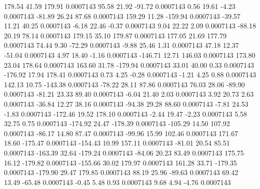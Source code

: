       178.54       41.59      179.91     0.0007143
       95.58       21.92      -91.72     0.0007143
        0.56       19.61       -4.23     0.0007143
      -81.89       26.24       87.68     0.0007143
      159.29       11.28     -159.94     0.0007143
      -39.57       11.21       40.25     0.0007143
       -6.18       22.46       -0.37     0.0007143
        9.04       22.22        2.09     0.0007143
      -88.18       20.19       78.14     0.0007143
      179.15       35.10      179.87     0.0007143
      177.05       21.69      177.79     0.0007143
       74.44        9.30      -72.29     0.0007143
       -9.88       25.46        1.31     0.0007143
       47.18       12.37      -51.04     0.0007143
        4.97       18.40       -1.16     0.0007143
     -146.71       12.71      146.03     0.0007143
      173.80       23.04      178.64     0.0007143
      163.60       31.78     -179.94     0.0007143
       33.01       40.00        0.33     0.0007143
     -176.92       17.94      178.41     0.0007143
        0.73        4.25       -0.28     0.0007143
       -1.21        4.25        0.88     0.0007143
      142.13       10.75     -143.38     0.0007143
      -78.22       28.11       87.86     0.0007143
       76.03       28.06      -89.90     0.0007143
      -81.21       23.33       89.40     0.0007143
       -6.04       21.40        2.03     0.0007143
        3.92       20.73        2.63     0.0007143
      -36.84       12.27       38.16     0.0007143
      -94.38       29.28       88.60     0.0007143
       -7.81       24.53       -1.83     0.0007143
     -172.46       19.52      178.10     0.0007143
       -2.44       19.47       -2.23     0.0007143
        5.58       32.75        0.75     0.0007143
     -174.92       24.47     -178.39     0.0007143
     -105.29       14.50      107.92     0.0007143
      -86.17       14.80       87.47     0.0007143
      -99.96       15.99      102.46     0.0007143
      171.67       18.60     -175.47     0.0007143
     -154.43       10.99      157.11     0.0007143
      -81.01       20.54       85.51     0.0007143
     -163.39       32.64     -179.24     0.0007143
      -84.06       20.23       83.49     0.0007143
      175.75       16.12     -179.82     0.0007143
     -155.66       30.02      179.97     0.0007143
      161.28       33.71     -179.35     0.0007143
     -179.90       29.47      179.85     0.0007143
       88.19       25.96      -89.63     0.0007143
       69.42       13.49      -65.48     0.0007143
       -0.45        5.48        0.93     0.0007143
        9.68        4.94       -4.76     0.0007143
